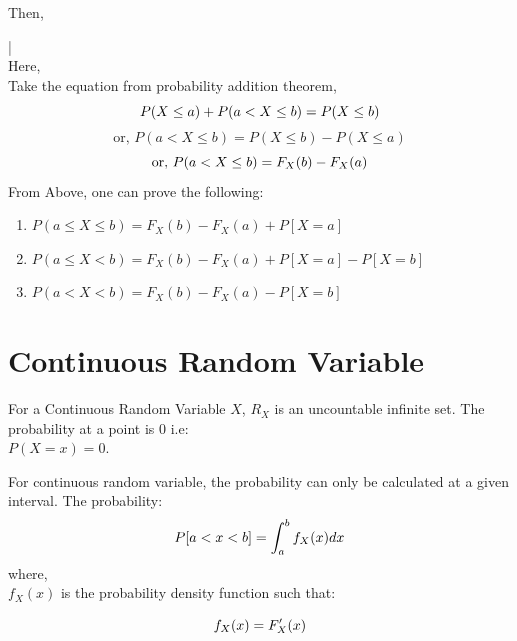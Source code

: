 Then, 
\begin{corollary}[\(P(a<X\le b) = F_X(b) - F_X(a)\)]
  \label{cor:probability-formula-cdf}|\\Here,\\ Take the
  equation from probability addition theorem,\\
  \begin{equation}
    \label{eqn:probability-addition-theorem}
    \begin{displaystyle}
      P(X\le a) + P(a < X \le  b) = P(X\le b)
    \end{displaystyle}
    \end{equation} \[
    \text{or, } P(a < X \le  b) = 
  P(X\le b) - P(X\le a) \]
  \[ \text{or, } P(a < X \le  b) = F_X(b) - F_X(a)\\ \]
  From Above, one can prove the following:
  \begin{enumerate}
    \item \(P(a \le X \le b) = F_X(b) - F_X(a)+P[X=a]\)
    \item \(P(a \le X <  b) = F_X(b) - F_X(a)+P[X=a]-P[X=b]\)
    \item \(P(a < X <  b) = F_X(b) - F_X(a)-P[X=b]\) 
  \end{enumerate}
\end{corollary}

\section{Continuous Random Variable}
\label{sec:continuous-random-variable} For a Continuous
Random Variable \(X\), \(R_X\) is an uncountable infinite
set.  The probability at a point is 0 i.e:\\
\(P(X=x) = 0\).

For continuous random variable, the probability can only
be calculated at a given interval. The probability:
\begin{equation}
  \label{eqn:prob-continuous-random-variable-interval}
  \begin{displaystyle} 
    P[a<x<b]=\int_{a}^{b} f_X(x)dx
  \end{displaystyle} 
\end{equation}
where,\\
\(f_X(x)\) is the probability density function such that:

\begin{equation}
  \label{eqn:relation-btw-cdf-pdf}
  \begin{displaystyle} 
    f_{X}(x) = F_X'(x)
  \end{displaystyle}
\end{equation}

